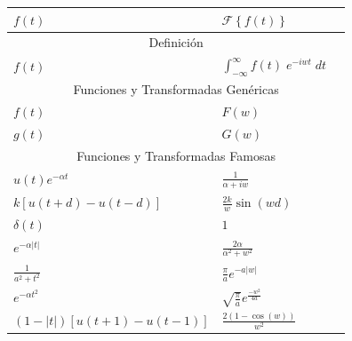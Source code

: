 \documentclass[12pt, fleqn]{report}                             %
\theoremstyle{break}                                            %
\newcommand{\Wrap}[1]           {\left( #1 \right)}             %
\newcommand{\Cos}[1] {\cos\Wrap{#1}}                            %
\newcommand{\Sin}[1] {\sin\Wrap{#1}}                            %
\newcommand{\FourierT}[1]   {\mathscr{F} \left\{ #1 \right\} }  %
\begin{document}
            \begin{table}[ht]
                \begin{tabular}{|m{16em}|m{16em}|@{}m{0pt}@{}}
                    \hline
                    \large{$f(t)$}          & \large{$\FourierT{f(t)}$}                 &\\[2em]      \hline\hline

                    \multicolumn{3}{|c|}{Definición}                                     \\           \hline
                    $f(t)$ &        $\int_{-\infty}^\infty f(t) \; e^{-iwt} \; dt$      &\\[1em]      \hline\hline
                    
                    \multicolumn{3}{|c|}{Funciones y Transformadas Genéricas}           \\            \hline
                    $f(t)$                  & $F(w)$                                    &\\[1em]      \hline
                    $g(t)$                  & $G(w)$                                    &\\[1em]      \hline\hline

                    \multicolumn{3}{|c|}{Funciones y Transformadas Famosas}             \\            \hline
                    $u(t)e^{-\alpha t}$     & $\frac{1}{\alpha + iw}                    $ &\\[1em]    \hline
                    $k[u(t+d) -u(t-d)]$     & $\frac{2k}{w} \Sin{wd}                    $ &\\[1em]    \hline
                    $\delta(t)        $     & $1                                        $ &\\[1em]    \hline
                    $e^{-\alpha|t|}   $     & $\frac{2\alpha}{\alpha^2+w^2}             $ &\\[1em]    \hline
                    $\frac{1}{a^2+t^2}$     & $\frac{\pi}{a} e^{-a |w|}                 $ &\\[1em]    \hline
                    $e^{-\alpha t^2}  $     & $\sqrt{\frac{\pi}{a}} e^{\frac{-w^2}{4a}} $ &\\[1em]    \hline
                    $(1-|t|)[u(t+1)-u(t-1)]$& $\frac{2(1 - \Cos{w})}{w^2}               $ &\\[1em]    \hline\hline
                    

\end{tabular}
\end{table}
\end{document}
